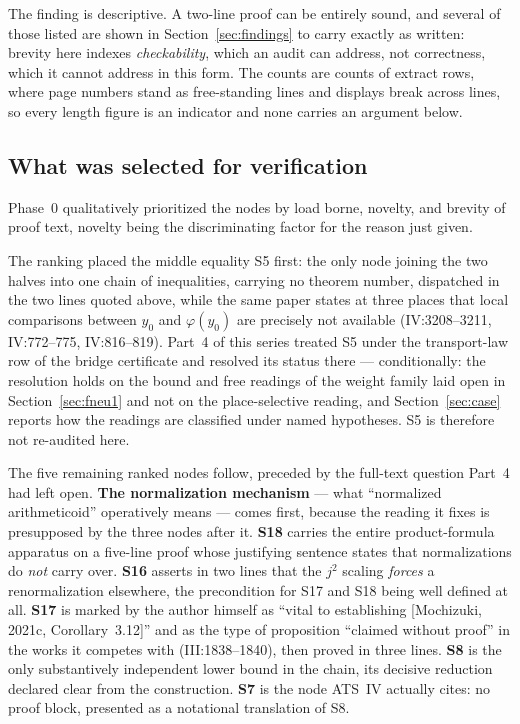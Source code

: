 \documentclass[11pt,a4paper]{article}
\theoremstyle{definition}
\theoremstyle{remark}
\begin{document}
The finding is descriptive. A two-line proof can be entirely sound, and several of
those listed are shown in Section~\ref{sec:findings} to carry exactly as written:
brevity here indexes \emph{checkability}, which an audit can address, not
correctness, which it cannot address in this form. The counts are counts of
extract rows, where page numbers stand as free-standing lines and displays break
across lines, so every length figure is an indicator and none carries an argument
below.

\subsection{What was selected for verification}

Phase~0 qualitatively prioritized the nodes by load borne, novelty, and
brevity of proof text, novelty being the discriminating factor for the
reason just given.

The ranking placed the middle equality S5 first: the only node joining the two
halves into one chain of inequalities, carrying no theorem number, dispatched in
the two lines quoted above, while the same paper states at three places that local
comparisons between $y_0$ and $\varphi(y_0)$ are precisely not available
(IV:3208--3211, IV:772--775, IV:816--819). Part~4 of this series treated S5 under
the transport-law row of the bridge certificate and resolved its status there ---
conditionally: the resolution holds on the bound and free readings of the
weight family laid open in Section~\ref{sec:fneu1} and not on the
place-selective reading, and Section~\ref{sec:case} reports how the
readings are classified under named hypotheses. S5 is therefore not
re-audited here.

The five remaining ranked nodes follow, preceded by the full-text question Part~4
had left open. \textbf{The normalization mechanism} --- what ``normalized
arithmeticoid'' operatively means --- comes first, because the reading it fixes is
presupposed by the three nodes after it. \textbf{S18} carries the entire
product-formula apparatus on a five-line proof whose justifying sentence states
that normalizations do \emph{not} carry over. \textbf{S16} asserts in two lines
that the $j^2$ scaling \emph{forces} a renormalization elsewhere, the precondition
for S17 and S18 being well defined at all. \textbf{S17} is marked by the author
himself as ``vital to establishing [Mochizuki, 2021c, Corollary~3.12]'' and as the
type of proposition ``claimed without proof'' in the works it competes with
(III:1838--1840), then proved in three lines. \textbf{S8} is the only
substantively independent lower bound in the chain, its decisive reduction
declared clear from the construction. \textbf{S7} is the node ATS~IV actually
cites: no proof block, presented as a notational translation of S8.
\end{document}
